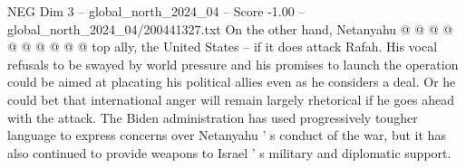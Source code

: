 \begin{textsample}{NEG Dim 3 – global\_north\_2024\_04 – Score -1.00 – global\_north\_2024\_04/200441327.txt}
On the other hand, Netanyahu @ @ @ @ @ @ @ @ @ @ top ally, the United States -- if it does attack Rafah.
His vocal refusals to be swayed by world pressure and his promises to launch the operation could be aimed at placating his political allies even as he considers a deal.
Or he could bet that international anger will remain largely rhetorical if he goes ahead with the attack.
The Biden administration has used progressively tougher language to express concerns over Netanyahu ' s conduct of the war, but it has also continued to provide weapons to Israel ' s military and diplomatic support.

\end{textsample}
